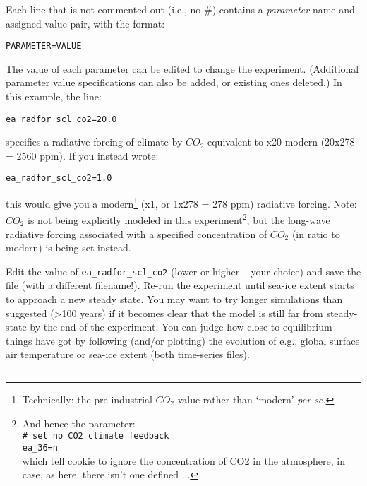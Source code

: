 Each line that is not commented out (i.e., no \#) contains a \textit{parameter} name and assigned value pair, with the format:
\vspace{-1mm}
\small\begin{verbatim}
PARAMETER=VALUE
\end{verbatim}\normalsize
\vspace{-1mm}
The value of each parameter can be edited to change the experiment. (Additional parameter value specifications can also be added, or existing ones deleted.) In this example, the line:
\vspace{-1mm}
\small\begin{verbatim}
ea_radfor_scl_co2=20.0
\end{verbatim}\normalsize
\vspace{-1mm}
specifies a radiative forcing of climate by \(CO_{2}\) equivalent to x20 modern (20x278 = 2560 ppm). If you instead wrote:
\vspace{-1mm}
\small\begin{verbatim}
ea_radfor_scl_co2=1.0
\end{verbatim}\normalsize
\vspace{-1mm}
this would give you a modern\footnote{Technically: the pre-industrial \(CO_{2}\) value rather than ‘modern’ \textit{per se.}} (x1, or 1x278 = 278 ppm) radiative forcing.
Note: \(CO_{2}\) is not being explicitly modeled in this experiment\footnote{And hence the parameter:
\\\texttt{\# set no CO2 climate feedback}
\\\texttt{ea\_36=n}
\\which tell cookie to ignore the concentration of CO2 in the atmosphere, in case, as here, there isn't one defined ...}, but the long-wave radiative forcing associated with a specified concentration of \(CO_{2}\) (in ratio to modern) is being set instead.

Edit the value of \texttt{ea\_radfor\_scl\_co2} (lower or higher -- your choice) and save the file (\uline{with a different filename!}). Re-run the experiment until sea-ice extent starts to approach a new steady state. You may want to try  longer simulations than suggested (\textgreater 100 years) if it becomes clear that the model is still far from steady-state by the end of the experiment. You can judge how close to equilibrium things have got by following (and/or plotting) the evolution of e.g., global surface air temperature or sea-ice extent (both time-series files).

\vspace{1mm}
\noindent\rule{4cm}{0.5pt}
\vspace{2mm}


